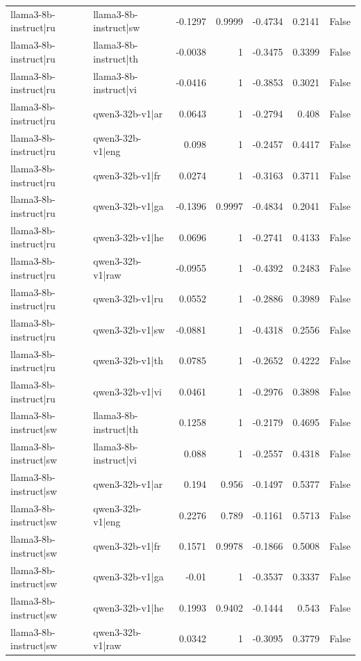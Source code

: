 \begin{table}
\begin{tabular}{l l r r r r l}
llama3-8b-instruct|ru & llama3-8b-instruct|sw & -0.1297 & 0.9999 & -0.4734 & 0.2141 & False \\
llama3-8b-instruct|ru & llama3-8b-instruct|th & -0.0038 & 1 & -0.3475 & 0.3399 & False \\
llama3-8b-instruct|ru & llama3-8b-instruct|vi & -0.0416 & 1 & -0.3853 & 0.3021 & False \\
llama3-8b-instruct|ru & qwen3-32b-v1|ar & 0.0643 & 1 & -0.2794 & 0.408 & False \\
llama3-8b-instruct|ru & qwen3-32b-v1|eng & 0.098 & 1 & -0.2457 & 0.4417 & False \\
llama3-8b-instruct|ru & qwen3-32b-v1|fr & 0.0274 & 1 & -0.3163 & 0.3711 & False \\
llama3-8b-instruct|ru & qwen3-32b-v1|ga & -0.1396 & 0.9997 & -0.4834 & 0.2041 & False \\
llama3-8b-instruct|ru & qwen3-32b-v1|he & 0.0696 & 1 & -0.2741 & 0.4133 & False \\
llama3-8b-instruct|ru & qwen3-32b-v1|raw & -0.0955 & 1 & -0.4392 & 0.2483 & False \\
llama3-8b-instruct|ru & qwen3-32b-v1|ru & 0.0552 & 1 & -0.2886 & 0.3989 & False \\
llama3-8b-instruct|ru & qwen3-32b-v1|sw & -0.0881 & 1 & -0.4318 & 0.2556 & False \\
llama3-8b-instruct|ru & qwen3-32b-v1|th & 0.0785 & 1 & -0.2652 & 0.4222 & False \\
llama3-8b-instruct|ru & qwen3-32b-v1|vi & 0.0461 & 1 & -0.2976 & 0.3898 & False \\
llama3-8b-instruct|sw & llama3-8b-instruct|th & 0.1258 & 1 & -0.2179 & 0.4695 & False \\
llama3-8b-instruct|sw & llama3-8b-instruct|vi & 0.088 & 1 & -0.2557 & 0.4318 & False \\
llama3-8b-instruct|sw & qwen3-32b-v1|ar & 0.194 & 0.956 & -0.1497 & 0.5377 & False \\
llama3-8b-instruct|sw & qwen3-32b-v1|eng & 0.2276 & 0.789 & -0.1161 & 0.5713 & False \\
llama3-8b-instruct|sw & qwen3-32b-v1|fr & 0.1571 & 0.9978 & -0.1866 & 0.5008 & False \\
llama3-8b-instruct|sw & qwen3-32b-v1|ga & -0.01 & 1 & -0.3537 & 0.3337 & False \\
llama3-8b-instruct|sw & qwen3-32b-v1|he & 0.1993 & 0.9402 & -0.1444 & 0.543 & False \\
llama3-8b-instruct|sw & qwen3-32b-v1|raw & 0.0342 & 1 & -0.3095 & 0.3779 & False \\

\end{tabular}
\end{table}
